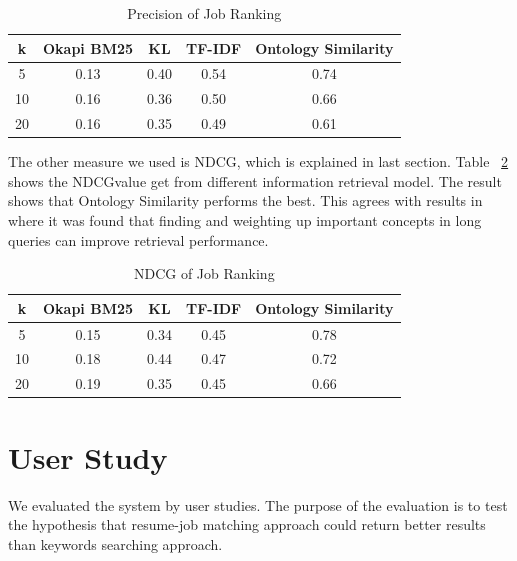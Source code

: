 \begin{table}[ht]
\caption{Precision of Job Ranking } %
\centering %
\begin{tabular}{    | c | c | c | c | c |  }
 \hline
       k     & Okapi BM25 & KL    & TF-IDF   & Ontology Similarity  \\
 \hline
       5     & 0.13       & 0.40  & 0.54     & 0.74   \\
 \hline
       10    & 0.16       & 0.36  & 0.50     & 0.66   \\
 \hline
       20    & 0.16       & 0.35  & 0.49     & 0.61   \\
 \hline

\end{tabular}
\label{tab:job_precision} %
\end{table}

The other measure we used is NDCG, which is explained in last section. Table ~\ref{tab:job_ndcg} shows the NDCGvalue get from different information retrieval model. The result shows that Ontology Similarity  performs the best. This agrees with results in  where it was found that finding and weighting up important concepts in long queries can improve retrieval performance.

\begin{table}[ht]
\caption{NDCG of Job Ranking } %
\centering %
\begin{tabular}{    | c | c | c | c | c |  }
 \hline
       k    & Okapi BM25 & KL    & TF-IDF & Ontology Similarity  \\
 \hline
       5    & 0.15       & 0.34  & 0.45     & 0.78   \\
 \hline
       10   & 0.18       & 0.44  & 0.47     & 0.72   \\
 \hline
       20   & 0.19       & 0.35  & 0.45     & 0.66   \\
 \hline

\end{tabular}
\label{tab:job_ndcg} %
\end{table}

\section{User Study}

We evaluated the system by user studies. The purpose of the evaluation is to test the hypothesis that resume-job matching approach could return better results than keywords searching approach.

